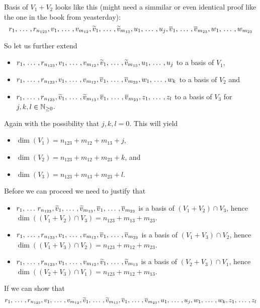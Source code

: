\begin{xrcs}
Basis of $V_1 + V_2$ looks like this (might need a simmilar or even identical proof like the one in the book from yeasterday):
\[ r_1, {\, \ldots \,\,}, r_{n_{123}}, v_1, {\, \ldots \,\,}, v_{m_{12}}, \widetilde{v}_1, {\, \ldots \,\,}, \widetilde{v}_{m_{13}}, u_1, {\, \ldots \,\,}, u_j, \overline{v}_1, {\, \ldots \,\,}, \overline{v}_{m_{23}}, w_1, {\, \ldots \,\,}, w_{m_{23}}
\]


So let us further extend
\begin{itemize}
  \item $r_1, {\, \ldots \,\,}, r_{n_{123}}, v_1, {\, \ldots \,\,}, v_{m_{12}}, \widetilde{v}_1, {\, \ldots \,\,}, \widetilde{v}_{m_{13}}, u_1, {\, \ldots \,\,}, u_j$ to a basis of $V_1$,
  \item $r_1, {\, \ldots \,\,}, r_{n_{123}}, v_1, {\, \ldots \,\,}, v_{m_{12}}, \overline{v}_1, {\, \ldots \,\,}, \overline{v}_{m_{23}}, w_1, {\, \ldots \,\,}, w_k$ to a basis of $V_2$ and
  \item $r_1, {\, \ldots \,\,}, r_{n_{123}}, \widetilde{v}_1, {\, \ldots \,\,}, \widetilde{v}_{m_{13}}, \overline{v}_1, {\, \ldots \,\,}, \overline{v}_{m_{23}}, z_1, {\, \ldots \,\,}, z_l$ to a basis of $V_3$ for $j,k,l \in \mathbb{N}_{\geq 0}$.
\end{itemize}

Again with the possibility that $j,k,l = 0$. This will yield
\begin{itemize}
  \item $\dim (V_1) = n_{123} + m_{12} + m_{13} + j$,
  \item $\dim (V_2) = n_{123} + m_{12} + m_{23} + k$, and
  \item $\dim (V_3) = n_{123} + m_{13} + m_{23} + l$.
\end{itemize}

Before we can proceed we need to justify that
\begin{itemize}
  \item $r_1,  {\, \ldots \,\,} r_{n_{123}} ,  \widetilde{v}_1, {\, \ldots \,\,}, \widetilde{v}_{m_{13}}, \overline{v}_1, {\, \ldots \,\,}, \overline{v}_{m_{23}}$ is a basis of $(V_1+V_2) \cap V_3$, hence $\dim ((V_1+V_2) \cap V_3) = n_{123} + m_{13}+m_{23}$.
  \item $r_1, {\, \ldots \,\,}, r_{n_{123}}, v_1, {\, \ldots \,\,}, v_{m_{12}}, \overline{v}_1, {\, \ldots \,\,}, \overline{v}_{m_{23}}$ is a basis of $(V_1+V_3) \cap V_2$, hence $\dim ((V_1+V_3) \cap V_2) = n_{123} + m_{12}+m_{23}$.
  \item $r_1, {\, \ldots \,\,}, r_{n_{123}}, v_1, {\, \ldots \,\,}, v_{m_{12}}, \widetilde{v}_1, {\, \ldots \,\,}, \widetilde{v}_{m_{13}}$ is a basis of $(V_2+V_3) \cap V_1$, hence $\dim ((V_2+V_3) \cap V_1) = n_{123} + m_{12}+m_{13}$.
\end{itemize}


If we can show that
\begin{equation}
  \label{eq: basis of V_1 + V_2 + V_3}
  r_1, {\, \ldots \,\,}, r_{n_{123}}, v_1, {\, \ldots \,\,}, v_{m_{12}}, \widetilde{v}_1, {\, \ldots \,\,}, \widetilde{v}_{m_{13}}, \overline{v}_1, {\, \ldots \,\,}, \overline{v}_{m_{23}}, u_1, {\, \ldots \,\,}, u_j, w_1, {\, \ldots \,\,}, w_k, z_1, {\, \ldots \,\,}, z_l
\end{equation}


\end{xrcs}
